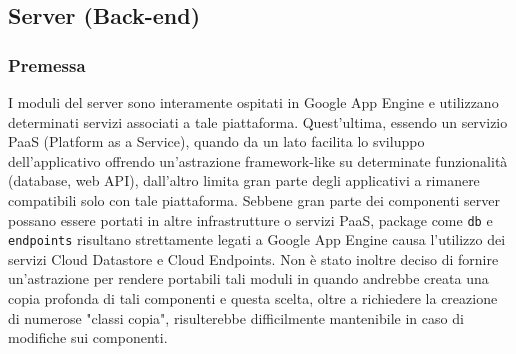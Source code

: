


\subsection{Server (Back-end)} %
\label{sub:server}

\subsubsection{Premessa}
\label{sub:server_premessa}
I moduli del server sono interamente ospitati in Google App Engine e utilizzano determinati servizi associati a tale piattaforma. Quest'ultima, essendo un servizio PaaS (Platform as a Service), quando da un lato facilita lo sviluppo dell'applicativo offrendo un'astrazione framework-like su determinate funzionalità (database, web API), dall'altro limita gran parte degli applicativi a rimanere compatibili solo con tale piattaforma.
Sebbene gran parte dei componenti server possano essere portati in altre infrastrutture o servizi PaaS, package come \texttt{db} e \texttt{endpoints} risultano strettamente legati a Google App Engine causa l'utilizzo dei servizi Cloud Datastore e Cloud Endpoints. Non è stato inoltre deciso di fornire un'astrazione per rendere portabili tali moduli in quando andrebbe creata una copia profonda di tali componenti e questa scelta, oltre a richiedere la creazione di numerose "classi copia", risulterebbe difficilmente mantenibile in caso di modifiche sui componenti.

